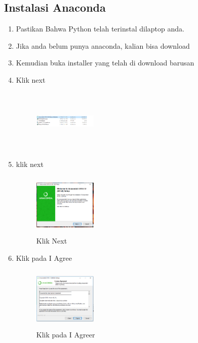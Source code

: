 \subsection{Instalasi Anaconda}
\begin{enumerate}
    \item Pastikan Bahwa Python telah terinstal dilaptop anda.
    \item Jika anda belum punya anaconda, kalian bisa download
    \item Kemudian buka installer yang telah di download barusan
    \item Klik next
    \begin{figure}[H]
        \centering
        \includegraphics[width=3cm,height=3cm]{figures/oni/1.png}
        \label{awal}
        \end{figure}

    \item klik next
    \begin{figure}[H]
        \centering
        \includegraphics[width=3cm,height=3cm]{figures/oni/2.png}
        \caption{Klik Next}
        \label{License}
        \end{figure}

    \item Klik pada I Agree
     \begin{figure}[H]
        \centering
        \includegraphics[width=3cm,height=3cm]{figures/oni/3.png}
        \caption{Klik pada I Agreer}
        \label{User}
        \end{figure}


\end{enumerate}
